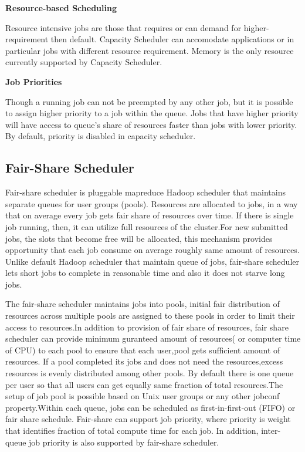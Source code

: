 \textbf{Resource-based Scheduling }

Resource intensive jobs are those that requires or can demand for higher-requirement then default. Capacity Scheduler can accomodate applications or in particular jobs with different resource requirement. Memory is the only resource currently supported by Capacity Scheduler. 

\textbf{Job Priorities }

Though a running job can not be preempted by any other job, but it is possible to assign higher priority to a job within the queue. Jobs that have higher priority will have access to queue's share of resources faster than jobs with lower priority. By default, priority is disabled in capacity scheduler.\cite{capacity} 


\subsection{Fair-Share Scheduler}

Fair-share scheduler is pluggable mapreduce Hadoop scheduler that maintains separate queues for user groups (pools). Resources are allocated to jobs, in a way that on average every job gets fair share of resources over time. If there is single job running, then, it can utilize full resources of the cluster.For new submitted jobs, the slots that become free will be allocated, this mechanism provides opportunity that each job consume on average roughly same amount of resources. Unlike default Hadoop scheduler that maintain queue of jobs, fair-share scheduler lets short jobs to complete in reasonable time and also it does not starve long jobs.  \cite{dynamic} \cite{fair}

 
The fair-share scheduler maintains jobs into pools, initial fair distribution of resources across multiple pools are assigned to these pools in order to limit their access to resources.In addition to provision of fair share of resources, fair share scheduler can provide minimum guranteed amount of resources( or computer time of CPU) to each pool to ensure that each user,pool gets sufficient amount of resources. If a pool completed its jobs and does not need the resources,excess resources is evenly distributed among other pools.\cite{fair}
 By default there is one queue per user so that all users can get equally same fraction of total resources.The setup of job pool is possible based on Unix user groups or any other jobconf property.Within each queue, jobs can be scheduled as first-in-first-out (FIFO) or fair share schedule. Fair-share can support job priority, where priority is weight that identifies fraction of total compute time for each job. In addition,  inter-queue job priority is also supported by fair-share scheduler.\cite{fair}
 
